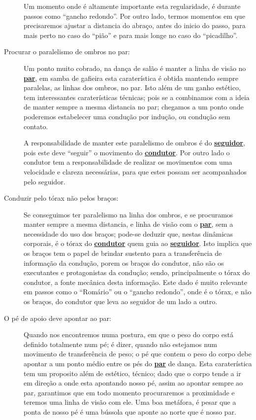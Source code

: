 \begin{description}
Um momento onde é altamente importante esta regularidade, 
é durante passos como ``gancho redondo''.
Por outro lado, termos momentos em que precisaremos ajustar a distancia do abraço,
antes do inicio do passo, para mais perto no caso do ``pião'' e para mais longe no caso do ``picadilho''.

\item[Procurar o paralelismo de ombros no par:] 
Um ponto muito cobrado, na dança de salão é manter a linha de visão no \hyperref[def:Par]{\textbf{par}},
em samba de gafieira esta caraterística é obtida mantendo sempre paralelas, as linhas dos ombros, no par.
Isto além de um ganho estético, tem interessantes caraterísticas técnicas;
pois se a combinamos com a ideia de manter sempre a mesma distancia no par;
chegamos a um ponto onde poderemos estabelecer uma condução por indução, ou condução sem contato.

A responsabilidade de manter este paralelismo de ombros é do \hyperref[def:Seguidor]{\textbf{seguidor}},
pois este deve ``seguir'' o movimento do \hyperref[def:Condutor]{\textbf{condutor}}.
Por outro lado o condutor tem a responsabilidade de realizar os movimentos com uma velocidade e clareza necessárias, 
para que estes possam ser acompanhados pelo seguidor.

\item[Conduzir pelo tórax não pelos braços:] 
Se conseguimos ter paralelismo na linha dos ombros,
e se procuramos manter sempre a mesma distancia, 
e linha de visão com o \hyperref[def:Par]{\textbf{par}}, 
sem a necessidade do uso dos braços;
pode-se deduzir que, nestas dinâmicas corporais,
é o tórax do \hyperref[def:Condutor]{\textbf{condutor}} quem guia ao \hyperref[def:Seguidor]{\textbf{seguidor}}.
Isto implica que os braços tem o papel de brindar sustento para a transferência de informação da condução,
porem os braços do condutor, não são os executantes e protagonistas da condução;
sendo, principalmente o tórax do condutor, a fonte mecânica desta informação.
Este dado é muito relevante em passos como o ``Romário'' ou o ``gancho redondo'',
onde é o tórax, e não os braços, do condutor que leva ao seguidor de um lado a outro. 

\item[O pé de apoio deve apontar ao par:] 
Quando nos encontremos numa postura, em que o peso do corpo está definido totalmente num pé;  
é dizer, quando não estejamos num movimento de transferência de peso;
o pé que contem o peso do corpo debe apontar a um ponto médio entre os pés do \hyperref[def:Par]{\textbf{par}} de dança.
Esta caraterística tem um proposito além de estético, técnico;
dado que o corpo tende a ir em direção a onde esta apontando nosso pé,
assim ao apontar sempre ao par, 
garantimos que em todo momento procuraremos a proximidade e teremos uma linha de visão  com ele.
Uma boa metáfora, é pesar que a ponta de nosso pé é uma bússola que aponte ao norte que é nosso par.
\end{description}
